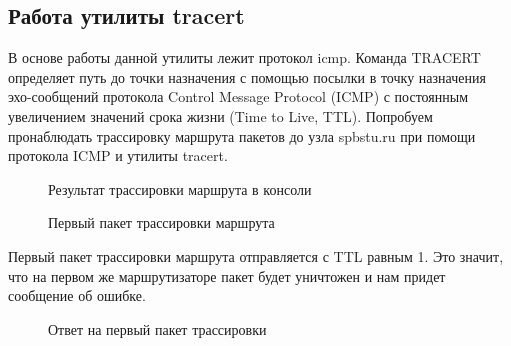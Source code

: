 \documentclass[a4paper, 14pt,russian]{article}
\begin{document}
\subsection{Работа утилиты tracert}
	В основе работы данной утилиты лежит протокол icmp. Команда TRACERT определяет путь до точки назначения с помощью посылки в точку назначения эхо-сообщений протокола Control Message Protocol (ICMP) с постоянным увеличением значений срока жизни (Time to Live, TTL).
	Попробуем пронаблюдать трассировку маршрута пакетов до узла spbstu.ru при помощи протокола ICMP и утилиты tracert. 

	\begin{figure}[h!]
		\caption{Результат трассировки маршрута в консоли}
		\label{img:tracert1}
	\end{figure}

	\begin{figure}[h!]
		\caption{Первый пакет трассировки маршрута}
		\label{img:tracert2}
	\end{figure}
	
	Первый пакет трассировки маршрута отправляется с TTL равным 1. Это значит, что на первом же маршрутизаторе пакет будет уничтожен и нам придет сообщение об ошибке.

	\begin{figure}[h!]
		\caption{Ответ на первый пакет трассировки}
		\label{img:tracert_ans}
	\end{figure}
\end{document}
